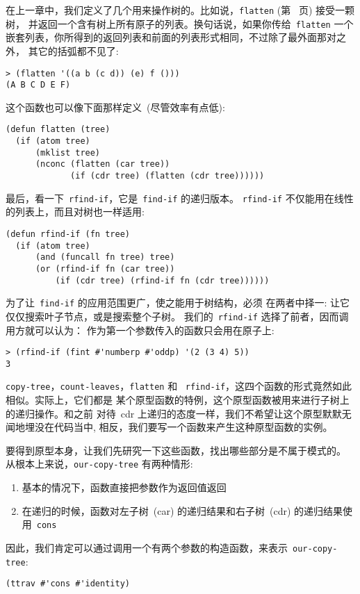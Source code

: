 在上一章中，我们定义了几个用来操作树的\utility{}。比如说，\texttt{flatten} 
(第~\pageref{fig:doubly-recursive_list_utilities} 页) 接受一颗树，
并返回一个含有树上所有原子的列表。换句话说，如果你传给~\texttt{flatten} 一个
嵌套列表，你所得到的返回列表和前面的列表形式相同，不过除了最外面那对之外，
其它的括弧都不见了:
\begin{lstlisting}
> (flatten '((a b (c d)) (e) f ()))
(A B C D E F)
\end{lstlisting}
这个函数也可以像下面那样定义~(尽管效率有点低):
\begin{lstlisting}
(defun flatten (tree)
  (if (atom tree)
      (mklist tree)
      (nconc (flatten (car tree))
             (if (cdr tree) (flatten (cdr tree))))))
\end{lstlisting}

最后，看一下~\texttt{rfind-if}，它是~\texttt{find-if} 的递归版本。
\texttt{rfind-if} 不仅能用在线性的列表上，而且对树也一样适用:
\begin{lstlisting}
(defun rfind-if (fn tree)
  (if (atom tree)
      (and (funcall fn tree) tree)
      (or (rfind-if fn (car tree))
          (if (cdr tree) (rfind-if fn (cdr tree))))))
\end{lstlisting}
为了让~\texttt{find-if} 的应用范围更广，使之能用于树结构，必须
在两者中择一: 让它仅仅搜索叶子节点，或是搜索整个子树。
我们的~\texttt{rfind-if} 选择了前者，因而调用方就可以认为：
作为第一个参数传入的函数只会用在原子上:
\begin{lstlisting}
> (rfind-if (fint #'numberp #'oddp) '(2 (3 4) 5))
3
\end{lstlisting}

\texttt{copy-tree}，\texttt{count-leaves}，\texttt{flatten} 和~
\texttt{rfind-if}，这四个函数的形式竟然如此相似。实际上，它们都是
某个原型函数的特例，这个原型函数被用来进行子树上的递归操作。和之前
对待~cdr 上递归的态度一样，我们不希望让这个原型默默无闻地埋没在代码当中,
相反，我们要写一个函数来产生这种原型函数的实例。

要得到原型本身，让我们先研究一下这些函数，找出哪些部分是不属于模式的。
从根本上来说，\texttt{our-copy-tree} 有两种情形:
\begin{enumerate}
\item 基本的情况下，函数直接把参数作为返回值返回
\item 在递归的时候，函数对左子树~(car) 的递归结果和右子树~(cdr) 
      的递归结果使用~\texttt{cons}
\end{enumerate}
因此，我们肯定可以通过调用一个有两个参数的构造函数，来表示~\texttt{our-copy-tree}:
\begin{lstlisting}
(ttrav #'cons #'identity)
\end{lstlisting}

